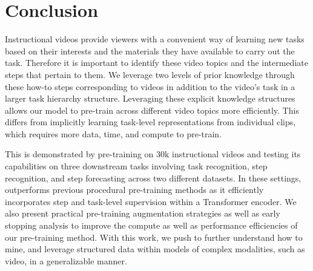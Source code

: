 \section{Conclusion}

Instructional videos provide viewers with a convenient way of learning new tasks based on their interests and the materials they have available to carry out the task. Therefore it is important to identify these video topics and the intermediate steps that pertain to them. We leverage two levels of prior knowledge through these how-to steps corresponding to videos in addition to the video's task in a larger task hierarchy structure. Leveraging these explicit knowledge structures allows our model to pre-train across different video topics more efficiently. This differs from implicitly learning task-level representations from individual clips, which requires more data, time, and compute to pre-train.

This is demonstrated by pre-training \model{} on 30k instructional videos and testing its capabilities on three downstream tasks involving task recognition, step recognition, and step forecasting across two different datasets. In these settings, \model{} outperforms previous procedural pre-training methods as it efficiently incorporates step and task-level supervision within a Transformer encoder. We also present practical pre-training augmentation strategies as well as early stopping analysis to improve the compute as well as performance efficiencies of our pre-training method. With this work, we push to further understand how to mine, and leverage structured data within models of complex modalities, such as video, in a generalizable manner.
